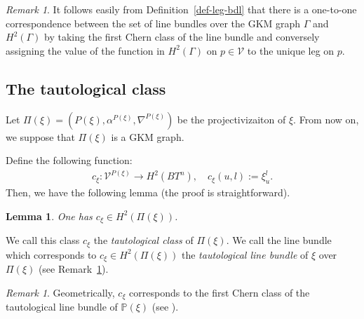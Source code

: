 \documentclass[12pt]{amsart}
\newtheorem{lemma}[theorem]{Lemma}
\theoremstyle{definition}
\theoremstyle{remark}
\newtheorem{remark}[theorem]{Remark}
\numberwithin{equation}{section}
\renewcommand{\P}{{\mathbb{P}}}
\begin{document}
\begin{remark}
\label{classification_line_bundles}
It follows easily from Definition~\ref{def-leg-bdl} that
there is a one-to-one correspondence between the set of
line bundles over the GKM graph $\Gamma$ and $H^{2}(\Gamma)$ by taking the first Chern class of the line bundle and conversely assigning the value of the function in $H^{2}(\Gamma)$ on $p\in \mathcal{V}$ to the unique leg on $p$.
\end{remark}

\subsection{The tautological class}
\label{sect:4.2}
Let $\Pi(\xi)=(P(\xi),\alpha^{P(\xi)}, \nabla^{P(\xi)})$ be the projectivizaiton of $\xi$.
From now on, we suppose that $\Pi(\xi)$ is a GKM graph.

Define the following function:
\begin{align*}
c_{\xi}:\mathcal{V}^{P(\xi)}\to H^{2}(BT^{n}),\quad c_{\xi}(u,l):=\xi_{u}^{l}.
\end{align*}
Then, we have the following lemma (the proof is straightforward).
\begin{lemma}
\label{tautological_class}
One has
$c_{\xi}\in H^{2}(\Pi(\xi))$.
\end{lemma}
We call this class $c_{\xi}$ the {\it tautological class} of $\Pi(\xi)$.
We call the line bundle which corresponds to $c_{\xi}\in H^{2}(\Pi(\xi))$ the {\it tautological line bundle} of $\xi$ over $\Pi(\xi)$ (see Remark~\ref{classification_line_bundles}).

\begin{remark}
Geometrically, $c_{\xi}$ corresponds to the first Chern class of the tautological line bundle of $\P(\xi)$ (see \cite{GH}).
\end{remark}

\end{document}
